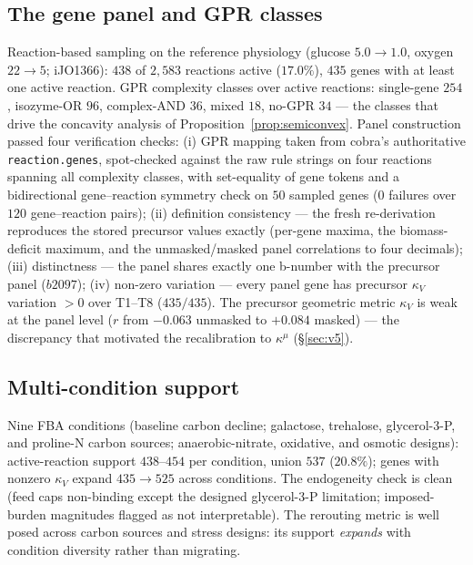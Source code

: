 \documentclass[11pt,a4paper]{article}
\theoremstyle{plain}
\theoremstyle{definition}
\theoremstyle{remark}
\newcommand{\kk}{\kappa_{\!V}}
\newcommand{\kmu}{\kappa^{\mu}}
\begin{document}
\subsection{The gene panel and GPR classes}
\label{sec:e22}
Reaction-based sampling on the reference physiology (glucose $5.0 \to 1.0$, oxygen $22 \to 5$; iJO1366): $438$ of
$2{,}583$ reactions active ($17.0\%$), $435$ genes with at least one
active reaction. GPR complexity classes over active reactions:
single-gene $254$, isozyme-OR $96$, complex-AND $36$, mixed $18$,
no-GPR $34$ --- the classes that drive the concavity analysis of
Proposition~\ref{prop:semiconvex}. Panel construction passed four
verification checks: (i) GPR mapping taken from cobra's authoritative
\texttt{reaction.genes}, spot-checked against the raw rule strings on
four reactions spanning all complexity classes, with set-equality of
gene tokens and a bidirectional gene--reaction symmetry check on $50$
sampled genes ($0$ failures over $120$ gene--reaction pairs); (ii)
definition consistency --- the fresh re-derivation reproduces the
stored precursor values exactly (per-gene maxima, the biomass-deficit
maximum, and the unmasked/masked panel correlations to four
decimals); (iii) distinctness --- the panel shares exactly one b-number with the precursor panel ($b2097$); (iv) non-zero variation ---
every panel gene has precursor $\kappa_V$ variation $> 0$ over T1--T8
($435/435$). The precursor geometric metric $\kk$ is weak at the panel
level ($r$ from $-0.063$ unmasked to $+0.084$ masked) --- the discrepancy that motivated the recalibration to $\kmu$ (\S\ref{sec:v5}).

\subsection{Multi-condition support}
\label{sec:e23}
Nine FBA conditions (baseline carbon decline; galactose, trehalose,
glycerol-3-P, and proline-N carbon sources; anaerobic-nitrate,
oxidative, and osmotic designs): active-reaction support $438$--$454$
per condition, union $537$ ($20.8\%$); genes with nonzero $\kk$
expand $435 \to 525$ across conditions. The endogeneity check is clean (feed caps non-binding except the designed glycerol-3-P
limitation; imposed-burden magnitudes flagged as not interpretable).
The rerouting metric is well posed across carbon sources and stress
designs: its support \emph{expands} with condition diversity rather
than migrating.
\end{document}
